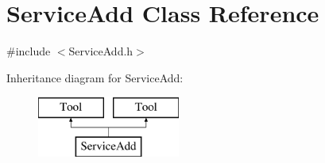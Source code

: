 \hypertarget{classServiceAdd}{\section{Service\-Add Class Reference}
\label{classServiceAdd}
}


{\ttfamily \#include $<$Service\-Add.\-h$>$}

Inheritance diagram for Service\-Add\-:\begin{figure}[H]
\begin{center}
\leavevmode
\includegraphics[height=2.000000cm]{classServiceAdd}
\end{center}
\end{figure}
